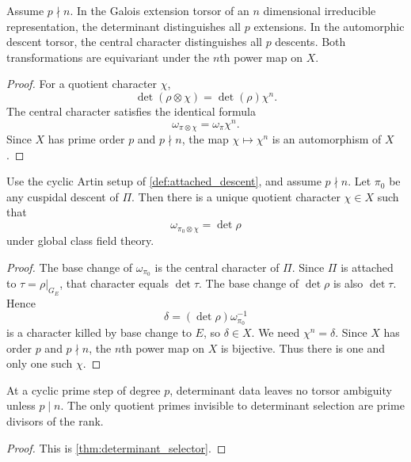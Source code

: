 \begin{theorem}\label{thm:determinant_selector}
Assume \(p\nmid n\). In the Galois extension torsor of an \(n\) dimensional irreducible representation, the determinant distinguishes all \(p\) extensions. In the automorphic descent torsor, the central character distinguishes all \(p\) descents. Both transformations are equivariant under the \(n\)th power map on \(X\).
\end{theorem}

\begin{proof}
For a quotient character \(\chi\),
\[
 \det(\rho\otimes\chi)=\det(\rho)\chi^n.
\]
The central character satisfies the identical formula
\[
 \omega_{\pi\otimes\chi}=\omega_\pi\chi^n.
\]
Since \(X\) has prime order \(p\) and \(p\nmid n\), the map \(\chi\mapsto\chi^n\) is an automorphism of \(X\).
\end{proof}

\begin{theorem}\label{thm:determinant_matched_descent}
Use the cyclic Artin setup of \cref{def:attached_descent}, and assume \(p\nmid n\). Let \(\pi_0\) be any cuspidal descent of \(\Pi\). Then there is a unique quotient character \(\chi\in X\) such that
\[
 \boxed{
 \omega_{\pi_0\otimes\chi}
 =
 \det\rho
 }
\]
under global class field theory.
\end{theorem}

\begin{proof}
The base change of \(\omega_{\pi_0}\) is the central character of \(\Pi\). Since \(\Pi\) is attached to \(\tau=\rho|_{G_E}\), that character equals \(\det\tau\). The base change of \(\det\rho\) is also \(\det\tau\). Hence
\[
 \delta=(\det\rho)\omega_{\pi_0}^{-1}
\]
is a character killed by base change to \(E\), so \(\delta\in X\). We need \(\chi^n=\delta\). Since \(X\) has order \(p\) and \(p\nmid n\), the \(n\)th power map on \(X\) is bijective. Thus there is one and only one such \(\chi\).
\end{proof}

\begin{corollary}\label{cor:rank_prime_sieve}
At a cyclic prime step of degree \(p\), determinant data leaves no torsor ambiguity unless \(p\mid n\). The only quotient primes invisible to determinant selection are prime divisors of the rank.
\end{corollary}

\begin{proof}
This is \cref{thm:determinant_selector}.
\end{proof}

